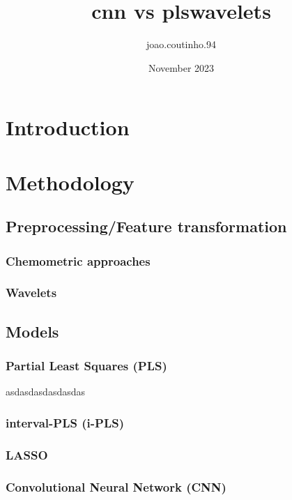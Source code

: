 \documentclass{article}
\title{cnn vs plswavelets}
\author{joao.coutinho.94 }
\date{November 2023}
\begin{document}
	
	\maketitle
	
	\section{Introduction}
	
	\section{Methodology}
	
	\subsection{Preprocessing/Feature transformation}
	
	\subsubsection{Chemometric approaches}
	
	\subsubsection{Wavelets}
	
	\subsection{Models}
	
	\subsubsection{Partial Least Squares (PLS)}

	asdasdasdasdasdas
	
	\subsubsection{interval-PLS (i-PLS)}
	
	\subsubsection{LASSO}
	
	\subsubsection{Convolutional Neural Network (CNN)}
	
\end{document}
